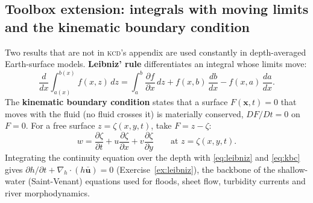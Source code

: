 \documentclass[11pt,letterpaper]{article}
\numberwithin{equation}{section}
\newcommand{\uu}{\mathbf{u}}
\newcommand{\xx}{\mathbf{x}}
\newcommand{\pd}[2]{\frac{\partial #1}{\partial #2}}
\newcommand{\od}[2]{\frac{d #1}{d #2}}
\newcommand{\Kundu}{\textnormal{\textsc{kcd}}}   %
\begin{document}
\subsection{Toolbox extension: integrals with moving limits and the kinematic boundary condition}
Two results that are not in \Kundu's appendix are used constantly in depth-averaged Earth-surface models.
\textbf{Leibniz' rule} differentiates an integral whose limits move:
\begin{equation}\label{eq:leibniz}
\od{}{x}\int_{a(x)}^{b(x)}f(x,z)\,dz=\int_{a}^{b}\pd{f}{x}\,dz+f(x,b)\,\od{b}{x}-f(x,a)\,\od{a}{x}.
\end{equation}
The \textbf{kinematic boundary condition} states that a surface $F(\xx,t)=0$ that moves with the fluid (no fluid
crosses it) is materially conserved, $DF/Dt=0$ on $F=0$. For a free surface $z=\zeta(x,y,t)$, take
$F=z-\zeta$:
\begin{equation}\label{eq:kbc}
w=\pd{\zeta}{t}+u\pd{\zeta}{x}+v\pd{\zeta}{y}\qquad\text{at } z=\zeta(x,y,t).
\end{equation}
Integrating the continuity equation over the depth with \eqref{eq:leibniz} and \eqref{eq:kbc} gives
$\partial h/\partial t+\nabla_h\cdot(h\bar{\uu})=0$ (Exercise~\ref{ex:leibniz}), the backbone of the shallow-water
(Saint-Venant) equations used for floods, sheet flow, turbidity currents and river morphodynamics.
\end{document}
